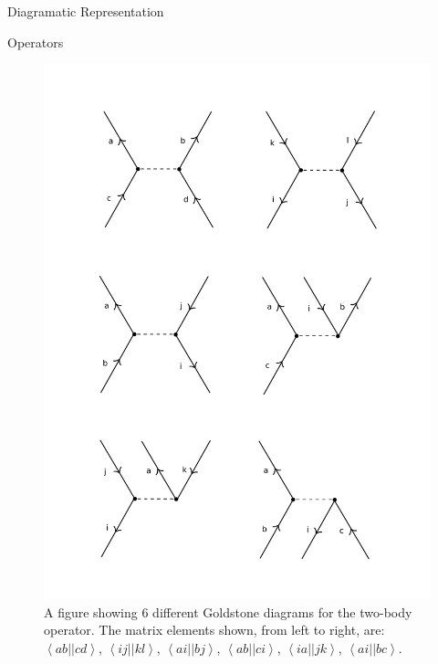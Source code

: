 \documentclass[twoside,english]{uiofysmaster}
\begin{document}
\begin{chapter}{Diagramatic Representation}
\begin{section}{Operators}
		\begin{figure}[H]
			\includegraphics[width=\textwidth]{Figures/TwoBodyOperator.pdf}
			\caption{A figure showing 6 different Goldstone diagrams for the two-body operator. The matrix elements shown, from left to right, are:
			$\left<ab||cd\right>$, $\left<ij||kl\right>$, $\left<ai||bj\right>$, $\left<ab||ci\right>$, $\left<ia||jk\right>$, $\left<ai||bc\right>$.}
			\label{Figure:TwoBodyOperator1}
		\end{figure}


\end{section}
\end{chapter}
\end{document}
